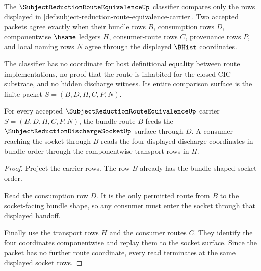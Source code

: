 \begin{definition}
\label{def:subject-reduction-route-equivalence-classifier}
The $\SubjectReductionRouteEquivalenceUp$ classifier compares only the rows displayed in \autoref{def:subject-reduction-route-equivalence-carrier}. Two accepted packets agree exactly when their bundle rows $B$, consumption rows $D$, componentwise $\hsame$ ledgers $H$, consumer-route rows $C$, provenance rows $P$, and local naming rows $N$ agree through the displayed $\BHist$ coordinates.

The classifier has no coordinate for host definitional equality between route implementations, no proof that the route is inhabited for the closed-CIC substrate, and no hidden discharge witness. Its entire comparison surface is the finite packet $S=(B,D,H,C,P,N)$.
\end{definition}

\begin{theorem}
\label{thm:subject-reduction-route-equivalence-bundle-socket-handoff}
For every accepted $\SubjectReductionRouteEquivalenceUp$ carrier $S=(B,D,H,C,P,N)$, the bundle route $B$ feeds the $\SubjectReductionDischargeSocketUp$ surface through $D$. A consumer reaching the socket through $B$ reads the four displayed discharge coordinates in bundle order through the componentwise transport rows in $H$.
\end{theorem}
\begin{proof}
Project the carrier rows. The row $B$ already has the bundle-shaped socket order.

Read the consumption row $D$. It is the only permitted route from $B$ to the socket-facing bundle shape, so any consumer must enter the socket through that displayed handoff.

Finally use the transport rows $H$ and the consumer routes $C$. They identify the four coordinates componentwise and replay them to the socket surface. Since the packet has no further route coordinate, every read terminates at the same displayed socket rows.
\end{proof}

